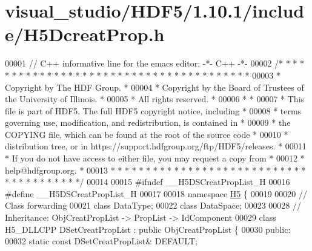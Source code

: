 \hypertarget{visual__studio_2_h_d_f5_21_810_81_2include_2_h5_dcreat_prop_8h_source}{}\section{visual\+\_\+studio/\+H\+D\+F5/1.10.1/include/\+H5\+Dcreat\+Prop.h}
\label{visual__studio_2_h_d_f5_21_810_81_2include_2_h5_dcreat_prop_8h_source}

\begin{DoxyCode}
00001 \textcolor{comment}{// C++ informative line for the emacs editor: -*- C++ -*-}
00002 \textcolor{comment}{/* * * * * * * * * * * * * * * * * * * * * * * * * * * * * * * * * * * * * * *}
00003 \textcolor{comment}{ * Copyright by The HDF Group.                                               *}
00004 \textcolor{comment}{ * Copyright by the Board of Trustees of the University of Illinois.         *}
00005 \textcolor{comment}{ * All rights reserved.                                                      *}
00006 \textcolor{comment}{ *                                                                           *}
00007 \textcolor{comment}{ * This file is part of HDF5.  The full HDF5 copyright notice, including     *}
00008 \textcolor{comment}{ * terms governing use, modification, and redistribution, is contained in    *}
00009 \textcolor{comment}{ * the COPYING file, which can be found at the root of the source code       *}
00010 \textcolor{comment}{ * distribution tree, or in https://support.hdfgroup.org/ftp/HDF5/releases.  *}
00011 \textcolor{comment}{ * If you do not have access to either file, you may request a copy from     *}
00012 \textcolor{comment}{ * help@hdfgroup.org.                                                        *}
00013 \textcolor{comment}{ * * * * * * * * * * * * * * * * * * * * * * * * * * * * * * * * * * * * * * */}
00014 
00015 \textcolor{preprocessor}{#ifndef \_\_H5DSCreatPropList\_H}
00016 \textcolor{preprocessor}{#define \_\_H5DSCreatPropList\_H}
00017 
00018 \textcolor{keyword}{namespace }\hyperlink{namespace_h5}{H5} \{
00019 
00020 \textcolor{comment}{// Class forwarding}
00021 \textcolor{keyword}{class }DataType;
00022 \textcolor{keyword}{class }DataSpace;
00023 
00028 \textcolor{comment}{//  Inheritance: ObjCreatPropList -> PropList -> IdComponent}
00029 \textcolor{keyword}{class }H5\_DLLCPP DSetCreatPropList : \textcolor{keyword}{public} ObjCreatPropList \{
00030    \textcolor{keyword}{public}:
00032         \textcolor{keyword}{static} \textcolor{keyword}{const} DSetCreatPropList& DEFAULT;

\end{DoxyCode}
